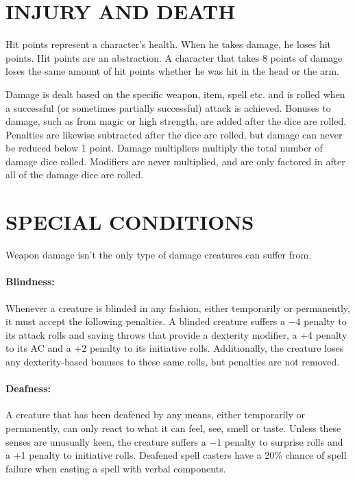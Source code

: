 \begin{multicols}{2}
\section{INJURY AND DEATH}

Hit points represent a character's health.  When he takes damage, he loses hit points.  Hit points are an abstraction.  A character that takes 8 points of damage loses the same amount of hit points whether he was hit in the head or the arm.  

Damage is dealt based on the specific weapon, item, spell etc. and is rolled when a successful (or sometimes partially successful) attack is achieved.  Bonuses to damage, such as from magic or high strength, are added after the dice are rolled.  Penalties are likewise subtracted after the dice are rolled, but damage can never be reduced below 1 point.  Damage multipliers multiply the total number of damage dice rolled.  Modifiers are never multiplied, and are only factored in after all of the damage dice are rolled.

\section{SPECIAL CONDITIONS}

Weapon damage isn't the only type of damage creatures can suffer from.

\paragraph{Blindness:} Whenever a creature is blinded in any fashion, either temporarily or permanently, it must accept the following penalties.  A blinded creature suffers a $-4$ penalty to its attack rolls and saving throws that provide a dexterity modifier, a +4 penalty to its AC and a +2 penalty to its initiative rolls.  Additionally, the creature loses any dexterity-based bonuses to these same rolls, but penalties are not removed.

\paragraph{Deafness:} A creature that has been deafened by any means, either temporarily or permanently, can only react to what it can feel, see, smell or taste.  Unless these senses are unusually keen, the creature suffers a $-1$ penalty to surprise rolls and a +1 penalty to initiative rolls.  Deafened spell casters have a 20\% chance of spell failure when casting a spell with verbal components.


\end{multicols}
